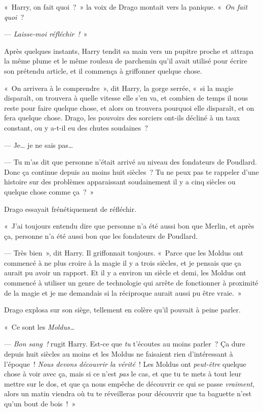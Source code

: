 «~Harry, on fait quoi~?~» la voix de Drago montait vers la panique. «~\emph{On fait quoi}~?

--- \emph{Laisse-moi réfléchir~!}~»

Après quelques instants, Harry tendit sa main vers un pupitre proche et attrapa la même plume et le même rouleau de parchemin qu'il avait utilisé pour écrire son prétendu article, et il commença à griffonner quelque chose.

«~On arrivera à le comprendre~», dit Harry, la gorge serrée, «~si la magie disparaît, on trouvera à quelle vitesse elle s'en va, et combien de temps il nous reste pour faire quelque chose, et alors on trouvera pourquoi elle disparaît, et on fera quelque chose. Drago, les pouvoirs des sorciers ont-ils décliné à un taux constant, ou y a-t-il eu des chutes soudaines~?

--- Je… je ne sais pas…

--- Tu m'as dit que personne n'était arrivé au niveau des fondateurs de Poudlard. Donc ça continue depuis au moins huit siècles~? Tu ne peux pas te rappeler d'une histoire sur des problèmes apparaissant soudainement il y a cinq siècles ou quelque chose comme ça~?~»

Drago essayait frénétiquement de réfléchir.

«~J'ai toujours entendu dire que personne n'a été aussi bon que Merlin, et après ça, personne n'a été aussi bon que les fondateurs de Poudlard.

--- Très bien~», dit Harry. Il griffonnait toujours. «~Parce que les Moldus ont commencé à ne plus croire à la magie il y a trois siècles, et je pensais que ça aurait pu avoir un rapport. Et il y a environ un siècle et demi, les Moldus ont commencé à utiliser un genre de technologie qui arrête de fonctionner à proximité de la magie et je me demandais si la réciproque aurait aussi pu être vraie.~»

Drago explosa sur son siège, tellement en colère qu'il pouvait à peine parler.

«~Ce sont les \emph{Moldus…}

--- \emph{Bon sang~!} rugit Harry. Est-ce que \emph{tu} t'écoutes au moins parler~? Ça dure depuis huit siècles au moins et les Moldus ne faisaient rien d'intéressant à l'époque~! \emph{Nous devons découvrir la vérité}~! Les Moldus ont \emph{peut-être} quelque chose à voir avec ça, mais si ce n'est \emph{pas} le cas, et que tu te mets à tout leur mettre sur le dos, et que ça nous empêche de découvrir ce qui se passe \emph{vraiment}, alors un matin viendra où tu te réveilleras pour découvrir que ta baguette n'est qu'un bout de bois~!~»

